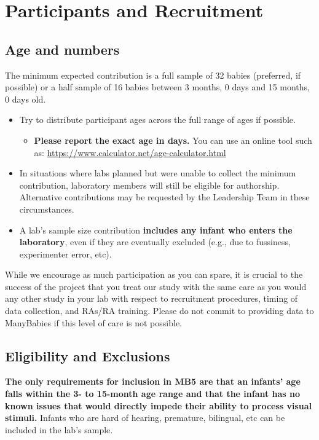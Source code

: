 \documentclass[
]{book}
\providecommand{\tightlist}{%
  \setlength{\itemsep}{0pt}\setlength{\parskip}{0pt}}
\begin{document}
\section{Participants and Recruitment}\label{participants-and-recruitment}

\subsection{Age and numbers}\label{age-and-numbers}

The minimum expected contribution is a full sample of 32 babies (preferred, if possible) or a half sample of 16 babies between 3 months, 0 days and 15 months, 0 days old.

\begin{itemize}
\tightlist
\item
  Try to distribute participant ages across the full range of ages if possible.

  \begin{itemize}
  \tightlist
  \item
    \textbf{Please report the exact age in days.} You can use an online tool such as: \url{https://www.calculator.net/age-calculator.html}
  \end{itemize}
\item
  In situations where labs planned but were unable to collect the minimum contribution, laboratory members will still be eligible for authorship. Alternative contributions may be requested by the Leadership Team in these circumstances.
\item
  A lab's sample size contribution \textbf{includes any infant who enters the laboratory}, even if they are eventually excluded (e.g., due to fussiness, experimenter error, etc).
\end{itemize}

While we encourage as much participation as you can spare, it is crucial to the success of the project that you treat our study with the same care as you would any other study in your lab with respect to recruitment procedures, timing of data collection, and RAs/RA training. Please do not commit to providing data to ManyBabies if this level of care is not possible.

\subsection{Eligibility and Exclusions}\label{eligibility-and-exclusions}

\textbf{The only requirements for inclusion in MB5 are that an infants' age falls within the 3- to 15-month age range and that the infant has no known issues that would directly impede their ability to process visual stimuli.} Infants who are hard of hearing, premature, bilingual, etc can be included in the lab's sample.
\end{document}
